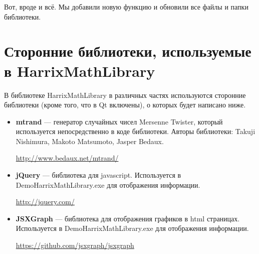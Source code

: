 \documentclass[a4paper,12pt]{article}
\begin{document}
Вот, вроде и всё. Мы добавили новую функцию и обновили все файлы и папки библиотеки.

\newpage
\section{Сторонние библиотеки, используемые в HarrixMathLibrary}\label{section_thirdparty}

В библиотеке HarrixMathLibrary в различных частях используются сторонние библиотеки (кроме того, что в Qt включены), о которых будет написано ниже.

\begin{itemize}
\item \textbf{mtrand} --- генератор случайных чисел Mersenne Twister, который используется непосредственно в коде библиотеки. Авторы библиотеки: Takuji Nishimura, Makoto Matsumoto, Jasper Bedaux.

\href {http://www.bedaux.net/mtrand/} {http://www.bedaux.net/mtrand/}

\item \textbf{jQuery} --- библиотека для javascript. Используется в DemoHarrixMathLibrary.exe для отображения информации.

\href {http://jquery.com/} {http://jquery.com/}

\item \textbf{JSXGraph} --- библиотека для отображения графиков  в html страницах. Используется в DemoHarrixMathLibrary.exe для отображения информации.

\href {https://github.com/jsxgraph/jsxgraph} {https://github.com/jsxgraph/jsxgraph}
\end{itemize}

\newpage
\end{document}

